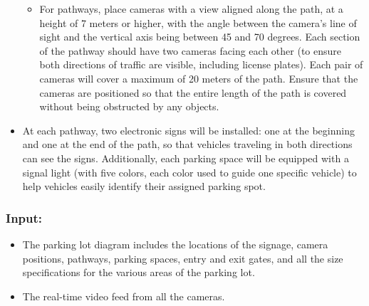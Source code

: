 \documentclass{article}
\begin{document}
\begin{itemize}[label=-]
\begin{itemize}[label=·]
          \item For pathways, place cameras with a view aligned along the path, at a height of 7 meters or higher, with the angle between the camera's line of sight and the vertical axis being between 45 and 70 degrees. Each section of the pathway should have two cameras facing each other (to ensure both directions of traffic are visible, including license plates). Each pair of cameras will cover a maximum of 20 meters of the path. Ensure that the cameras are positioned so that the entire length of the path is covered without being obstructed by any objects.
        \end{itemize}
      \item At each pathway, two electronic signs will be installed: one at the beginning and one at the end of the path, so that vehicles traveling in both directions can see the signs. Additionally, each parking space will be equipped with a signal light (with five colors, each color used to guide one specific vehicle) to help vehicles easily identify their assigned parking spot.
     \end{itemize}
    \subsubsection{Input:}
    \begin{itemize}[label=-]
      \item The parking lot diagram includes the locations of the signage, camera positions, pathways, parking spaces, entry and exit gates, and all the size specifications for the various areas of the parking lot.
      \item The real-time video feed from all the cameras.
    \end{itemize}
\end{document}
